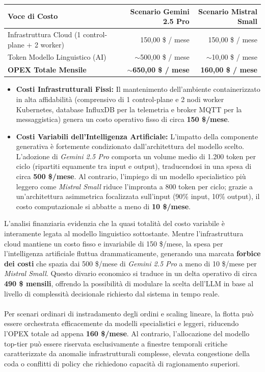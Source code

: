 \begin{table}[ht]
\centering
\begin{tabular}{lrr}
\hline
\textbf{Voce di Costo} & \textbf{Scenario Gemini 2.5 Pro} & \textbf{Scenario Mistral Small} \\ \hline
Infrastruttura Cloud (1 control-plane + 2 worker) & 150,00 \$ / mese & 150,00 \$ / mese \\
Token Modello Linguistico (AI) & $\sim$500,00 \$ / mese & $\sim$10,00 \$ / mese \\ \hline
\textbf{OPEX Totale Mensile} & \textbf{$\sim$650,00 \$ / mese} & \textbf{160,00 \$ / mese} \\ \hline
\end{tabular}
\label{tab:costi_opex}
\end{table}

\begin{itemize}
    \item \textbf{Costi Infrastrutturali Fissi:} Il mantenimento dell'ambiente containerizzato in alta affidabilità (comprensivo di 1 control-plane e 2 nodi worker Kubernetes, database InfluxDB per la telemetria e broker MQTT per la messaggistica) genera un costo operativo fisso di circa \textbf{150 \$/mese}.
    \item \textbf{Costi Variabili dell'Intelligenza Artificiale:} L'impatto della componente generativa è fortemente condizionato dall'architettura del modello scelto. L'adozione di \textit{Gemini 2.5 Pro} comporta un volume medio di 1.200 token per ciclo (ripartiti equamente tra input e output), traducendosi in una spesa di circa \textbf{500 \$/mese}. Al contrario, l'impiego di un modello specialistico più leggero come \textit{Mistral Small} riduce l'impronta a 800 token per ciclo; grazie a un'architettura asimmetrica focalizzata sull'input (90\% input, 10\% output), il costo computazionale si abbatte a meno di \textbf{10 \$/mese}.
\end{itemize}
L'analisi finanziaria evidenzia che la quasi totalità del costo variabile è interamente legata al modello linguistico sottostante. Mentre l'infrastruttura cloud mantiene un costo fisso e invariabile di 150 \$/mese, la spesa per l'intelligenza artificiale fluttua drammaticamente, generando una marcata \textbf{forbice dei costi} che spazia dai 500 \$/mese di \textit{Gemini 2.5 Pro} a meno di 10 \$/mese per \textit{Mistral Small}. Questo divario economico si traduce in un delta operativo di circa \textbf{490 \$ mensili}, offrendo la possibilità di modulare la scelta dell'LLM in base al livello di complessità decisionale richiesto dal sistema in tempo reale. \\\\
Per scenari ordinari di instradamento degli ordini e scaling lineare, la flotta può essere orchestrata efficacemente da modelli specialistici e leggeri, riducendo l'OPEX totale ad appena \textbf{160 \$/mese}. Al contrario, l'allocazione del modello top-tier può essere riservata esclusivamente a finestre temporali critiche caratterizzate da anomalie infrastrutturali complesse, elevata congestione della coda o conflitti di policy che richiedono capacità di ragionamento superiori.

